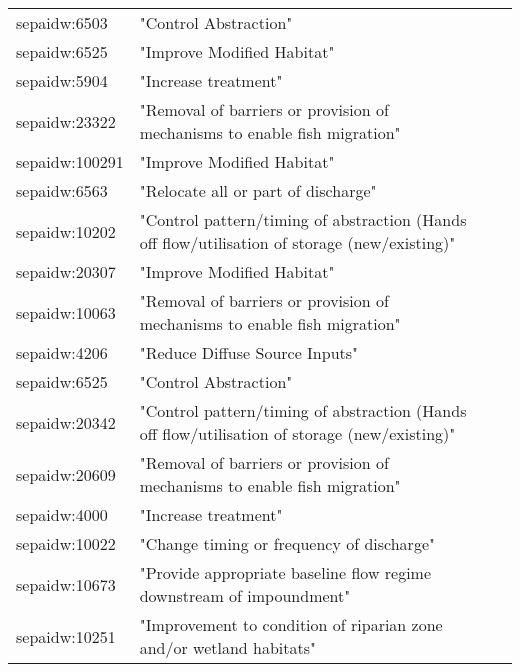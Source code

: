 \documentclass[a4paper,10pt]{article}
\begin{document}
\begin{table}[!tb]
\begin{center}
\begin{tabular}{llcr}
 sepaidw:6503   & "Control Abstraction"                                                     \\                    
 sepaidw:6525   & "Improve Modified Habitat"                                               \\                     
 sepaidw:5904   & "Increase treatment"                                                  \\                        
 sepaidw:23322  & "Removal of barriers or provision of mechanisms to enable fish migration"         \\            
 sepaidw:100291 & "Improve Modified Habitat"                                          \\                          
 sepaidw:6563   & "Relocate all or part of discharge"                               \\                            
 sepaidw:10202  & "Control pattern/timing of abstraction (Hands off flow/utilisation of storage (new/existing)" \\
 sepaidw:20307  & "Improve Modified Habitat"                                                      \\              
 sepaidw:10063  & "Removal of barriers or provision of mechanisms to enable fish migration"   \\                  
 sepaidw:4206   & "Reduce Diffuse Source Inputs"                                             \\                   
 sepaidw:6525   & "Control Abstraction"                                                     \\                    
sepaidw:20342  & "Control pattern/timing of abstraction (Hands off flow/utilisation of storage (new/existing)" \\
 sepaidw:20609  & "Removal of barriers or provision of mechanisms to enable fish migration"     \\                
 sepaidw:4000   & "Increase treatment"                                                 \\                         
 sepaidw:10022  & "Change timing or frequency of discharge"                           \\                          
 sepaidw:10673  & "Provide appropriate baseline flow regime downstream of impoundment"    \\                      
sepaidw:10251  & "Improvement to condition of riparian zone and/or wetland habitats"      \\                     

\end{tabular}
\end{center}
\end{table}
\end{document}
